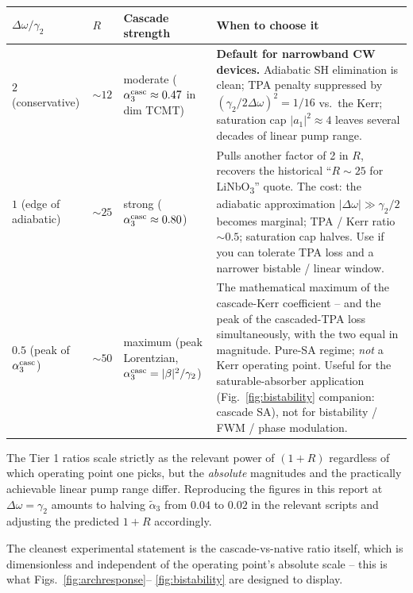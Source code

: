 \documentclass[11pt,a4paper]{article}
\newcommand{\Dom}{\Delta\omega}
\begin{document}
\begin{center}
\renewcommand{\arraystretch}{1.25}
\setlength{\tabcolsep}{4pt}
\footnotesize
\begin{tabular}{>{\raggedright\arraybackslash}p{}
                >{\raggedright\arraybackslash}p{}
                >{\raggedright\arraybackslash}p{}
                >{\raggedright\arraybackslash}p{}}
\toprule
$\Dom/\gamma_2$ & $R$ & Cascade strength & When to choose it \\
\midrule
$2$ (conservative) & $\sim 12$ &
moderate ($\alpha_3^{\rm casc} \approx 0.47$ in dim TCMT) &
\textbf{Default for narrowband CW devices.} Adiabatic SH elimination
is clean; TPA penalty suppressed by $(\gamma_2/2\Dom)^2 = 1/16$ vs.\
the Kerr; saturation cap $|a_1|^2 \approx 4$ leaves several decades
of linear pump range. \\
$1$ (edge of adiabatic) & $\sim 25$ &
strong ($\alpha_3^{\rm casc} \approx 0.80$) &
Pulls another factor of 2 in $R$, recovers the historical
``$R \sim 25$ for LiNbO\textsubscript{3}'' quote. The cost: the
adiabatic approximation $|\Dom| \gg \gamma_2/2$ becomes marginal;
TPA / Kerr ratio $\sim 0.5$; saturation cap halves. Use if you can
tolerate TPA loss and a narrower bistable / linear window. \\
$0.5$ (peak of $\alpha_3^{\rm casc}$) & $\sim 50$ &
maximum (peak Lorentzian, $\alpha_3^{\rm casc} = |\beta|^2/\gamma_2$) &
The mathematical maximum of the cascade-Kerr coefficient -- and the
peak of the cascaded-TPA loss simultaneously, with the two equal in
magnitude. Pure-SA regime; \emph{not} a Kerr operating point.
Useful for the saturable-absorber application (Fig.~\ref{fig:bistability}
companion: cascade SA), not for bistability / FWM / phase modulation. \\
\bottomrule
\end{tabular}
\end{center}

The Tier 1 ratios scale strictly as the relevant power of $(1+R)$
regardless of which operating point one picks, but the
\emph{absolute} magnitudes and the practically achievable linear pump
range differ.  Reproducing the figures in this report at $\Dom = \gamma_2$
amounts to halving $\widetilde\alpha_3$ from $0.04$ to $0.02$ in the
relevant scripts and adjusting the predicted $1+R$ accordingly.

The cleanest experimental statement is the cascade-vs-native ratio
itself, which is dimensionless and independent of the operating
point's absolute scale -- this is what Figs.~\ref{fig:archresponse}--%
\ref{fig:bistability} are designed to display.
\end{document}
